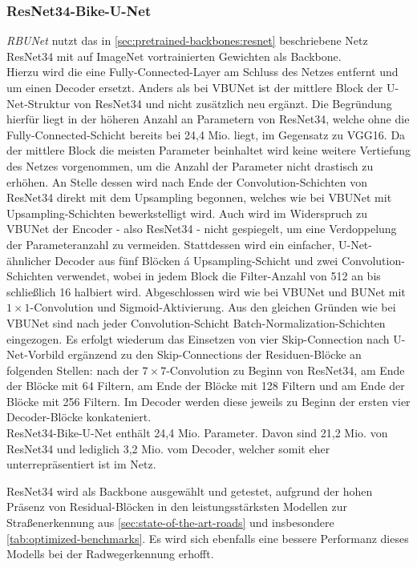 \subsubsection{ResNet34-Bike-U-Net}

\textit{\ac{RBUNet}} nutzt das in \autoref{sec:pretrained-backbones:resnet} beschriebene Netz ResNet34 
mit auf ImageNet vortrainierten Gewichten als Backbone. \\
Hierzu wird die eine Fully-Connected-Layer am Schluss des Netzes entfernt und um einen Decoder ersetzt. 
Anders als bei \ac{VBUNet} ist der mittlere Block der U-Net-Struktur von ResNet34 
und nicht zusätzlich neu ergänzt. Die Begründung hierfür liegt in der höheren Anzahl an Parametern 
von ResNet34, welche ohne die Fully-Connected-Schicht bereits bei 24,4 Mio. liegt, im Gegensatz zu VGG16. 
Da der mittlere Block die meisten Parameter beinhaltet wird keine weitere Vertiefung des Netzes vorgenommen,
um die Anzahl der Parameter nicht drastisch zu erhöhen. An Stelle dessen wird nach Ende der Convolution-Schichten von 
ResNet34 direkt mit dem Upsampling begonnen, welches wie bei \ac{VBUNet} mit Upsampling-Schichten 
bewerkstelligt wird. Auch wird im Widerspruch zu \ac{VBUNet} der Encoder - also ResNet34 - nicht gespiegelt, 
um eine Verdoppelung der Parameteranzahl zu vermeiden. Stattdessen wird ein einfacher, U-Net-ähnlicher Decoder
aus fünf Blöcken á Upsampling-Schicht und zwei Convolution-Schichten verwendet, wobei in jedem Block 
die Filter-Anzahl von 512 an bis schließlich 16 halbiert wird. Abgeschlossen wird wie bei \ac{VBUNet} und
\ac{BUNet} mit $1\times 1$-Convolution und Sigmoid-Aktivierung. Aus den gleichen Gründen wie bei \ac{VBUNet}
sind nach jeder Convolution-Schicht Batch-Normalization-Schichten eingezogen. 
Es erfolgt wiederum das Einsetzen von vier Skip-Connection nach U-Net-Vorbild ergänzend zu den 
Skip-Connections der Residuen-Blöcke an folgenden Stellen: 
nach der $7\times 7$-Convolution zu Beginn von ResNet34, 
am Ende der Blöcke mit 64 Filtern, am Ende der Blöcke mit 128 Filtern 
und am Ende der Blöcke mit 256 Filtern. Im Decoder werden diese jeweils 
zu Beginn der ersten vier Decoder-Blöcke konkateniert. \\ 
ResNet34-Bike-U-Net enthält 24,4 Mio. Parameter. Davon sind 21,2 Mio. von ResNet34 und lediglich 3,2 Mio. 
vom Decoder, welcher somit eher unterrepräsentiert ist im Netz.  

ResNet34 wird als Backbone ausgewählt und getestet, aufgrund der hohen Präsenz von 
Residual-Blöcken in den leistungsstärksten Modellen 
zur Straßenerkennung aus \autoref{sec:state-of-the-art-roads} und insbesondere \autoref{tab:optimized-benchmarks}.
Es wird sich ebenfalls eine bessere Performanz dieses Modells bei der Radwegerkennung erhofft. 

